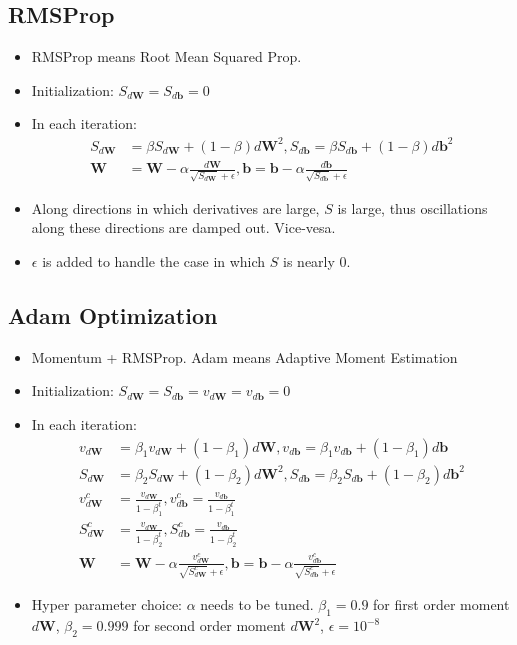 \subsection{RMSProp}
\begin{itemize}
  \item RMSProp means Root Mean Squared Prop.
  \item Initialization: $S_{d\mathbf{W}}=S_{d\mathbf{b}}=0$
  \item In each iteration:
  \begin{align*}
    S_{d\mathbf{W}}&=\beta S_{d\mathbf{W}}+(1-\beta)d\mathbf{W}^2, S_{d\mathbf{b}}=\beta S_{d\mathbf{b}}+(1-\beta)d\mathbf{b}^2\\
    \mathbf{W}&=\mathbf{W}-\alpha \frac{d\mathbf{W}}{\sqrt{S_{d\mathbf{W}}} + \epsilon}, \mathbf{b}=\mathbf{b}-\alpha \frac{d\mathbf{b}}{\sqrt{S_{d\mathbf{b}}} + \epsilon}
  \end{align*}
  \item Along directions in which derivatives are large, $S$ is large, thus oscillations along these directions are damped out. Vice-vesa.
  \item $\epsilon$ is added to handle the case in which $S$ is nearly 0. 
\end{itemize}
\subsection{Adam Optimization}
\begin{itemize}
  \item Momentum + RMSProp. Adam means Adaptive Moment Estimation
  \item Initialization: $S_{d\mathbf{W}}=S_{d\mathbf{b}}=v_{d\mathbf{W}}=v_{d\mathbf{b}}=0$
  \item In each iteration:
  \begin{align*}
    v_{d\mathbf{W}}&=\beta_1 v_{d\mathbf{W}}+(1-\beta_1)d\mathbf{W}, v_{d\mathbf{b}}=\beta_1 v_{d\mathbf{b}}+(1-\beta_1)d\mathbf{b}\\
    S_{d\mathbf{W}}&=\beta_2 S_{d\mathbf{W}}+(1-\beta_2)d\mathbf{W}^2, S_{d\mathbf{b}}=\beta_2 S_{d\mathbf{b}}+(1-\beta_2)d\mathbf{b}^2\\
    v_{d\mathbf{W}}^{c}&=\frac{v_{d\mathbf{W}}}{1-\beta_1^{t}}, v_{d\mathbf{b}}^{c}=\frac{v_{d\mathbf{b}}}{1-\beta_1^{t}}\\
    S_{d\mathbf{W}}^{c}&=\frac{v_{d\mathbf{W}}}{1-\beta_2^{t}}, S_{d\mathbf{b}}^{c}=\frac{v_{d\mathbf{b}}}{1-\beta_2^{t}}\\
    \mathbf{W}&=\mathbf{W}-\alpha \frac{v_{d\mathbf{W}}^{c}}{\sqrt{S_{d\mathbf{W}}^c} + \epsilon}, \mathbf{b}=\mathbf{b}-\alpha \frac{v_{d\mathbf{b}}^{c}}{\sqrt{S_{d\mathbf{b}}^c} + \epsilon}
  \end{align*}
  \item Hyper parameter choice: $\alpha$ needs to be tuned. $\beta_1=0.9$ for first order moment $d\mathbf{W}$, $\beta_2=0.999$ for second order moment $d\mathbf{W}^2$, $\epsilon=10^{-8}$
\end{itemize}
